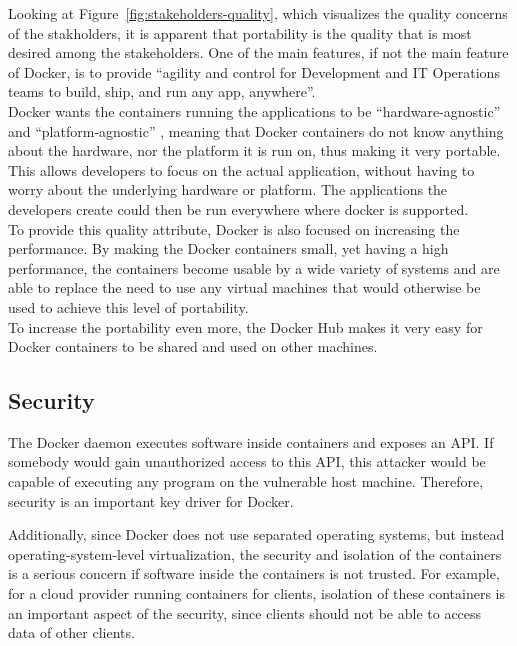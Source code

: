 Looking at Figure~\ref{fig:stakeholders-quality}, which visualizes the quality concerns of the stakholders, it is apparent that portability is the quality that is most desired among the stakeholders. One of the main features, if not the main feature of Docker, is to provide ``agility and control for Development and IT Operations teams to build, ship, and run any app, anywhere''\cite{dockermain}.\\
Docker wants the containers running the applications to be ``hardware-agnostic'' and ``platform-agnostic'' \cite{dockerrepo}, meaning that Docker containers do not know anything about the hardware, nor the platform it is run on, thus making it very portable. This allows developers to focus on the actual application, without having to worry about the underlying hardware or platform. The applications the developers create could then be run everywhere where docker is supported.\\
To provide this quality attribute, Docker is also focused on increasing the performance. By making the Docker containers small, yet having a high performance, the containers become usable by a wide variety of systems and are able to replace the need to use any virtual machines that would otherwise be used to achieve this level of portability\cite{dockerrepo}.\\
To increase the portability even more, the Docker Hub makes it very easy for Docker containers to be shared and used on other machines.

\subsection{Security}
The Docker daemon executes software inside containers and exposes an API. If somebody would gain unauthorized access to this API, this attacker would be capable of executing any program on the vulnerable host machine. Therefore, security is an important key driver for Docker. 

Additionally, since Docker does not use separated operating systems, but instead operating-system-level virtualization, the security and isolation of the containers is a serious concern if software inside the containers is not trusted. For example, for a cloud provider running containers for clients, isolation of these containers is an important aspect of the security, since clients should not be able to access data of other clients.



